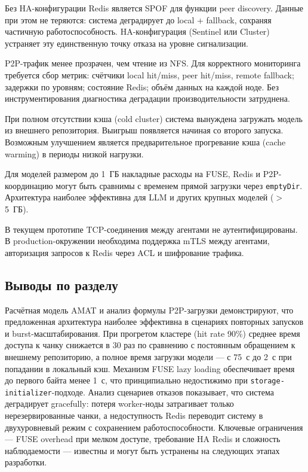  Без HA-конфигурации Redis является SPOF для функции peer discovery. Данные при этом не теряются: система деградирует до local + fallback, сохраняя частичную работоспособность. HA-конфигурация (Sentinel или Cluster) устраняет эту единственную точку отказа на уровне сигнализации.

 P2P-трафик менее прозрачен, чем чтение из NFS. Для корректного мониторинга требуется сбор метрик: счётчики local hit/miss, peer hit/miss, remote fallback; задержки по уровням; состояние Redis; объём данных на каждой ноде. Без инструментирования диагностика деградации производительности затруднена.

 При полном отсутствии кэша (cold cluster) система вынуждена загружать модель из внешнего репозитория. Выигрыш появляется начиная со второго запуска. Возможным улучшением является предварительное прогревание кэша (cache warming) в периоды низкой нагрузки.

 Для моделей размером до 1~ГБ накладные расходы на FUSE, Redis и P2P-координацию могут быть сравнимы с временем прямой загрузки через \texttt{emptyDir}. Архитектура наиболее эффективна для LLM и других крупных моделей ($>$5~ГБ).

 В текущем прототипе TCP-соединения между агентами не аутентифицированы. В production-окружении необходима поддержка mTLS между агентами, авторизация запросов к Redis через ACL и шифрование трафика.

\subsection{Выводы по разделу}

Расчётная модель AMAT и анализ формулы P2P-загрузки демонстрируют, что предложенная архитектура наиболее эффективна в сценариях повторных запусков и burst-масштабирования. При прогретом кластере (hit rate 90\%) среднее время доступа к чанку снижается в 30 раз по сравнению с постоянным обращением к внешнему репозиторию, а полное время загрузки модели --- с 75~с до 2~с при попадании в локальный кэш. Механизм FUSE lazy loading обеспечивает время до первого байта менее 1~с, что принципиально недостижимо при \texttt{storage-initializer}-подходе. Анализ сценариев отказов показывает, что система деградирует gracefully: потеря worker-ноды затрагивает только нерезервированные чанки, а недоступность Redis переводит систему в двухуровневый режим с сохранением работоспособности. Ключевые ограничения --- FUSE overhead при мелком доступе, требование HA Redis и сложность наблюдаемости --- известны и могут быть устранены на следующих этапах разработки.
